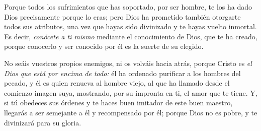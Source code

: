 \begin{body}
	Porque todos los sufrimientos que has soportado, por ser hombre, te los ha dado Dios precisamente porque lo eras; pero Dios ha prometido también otorgarte todos sus atributos, una vez que hayas sido divinizado y te hayas vuelto inmortal. Es decir, \emph{conócete a ti mismo} mediante el conocimiento de Dios, que te ha creado, porque conocerlo y ser conocido por él es la suerte de su elegido.
	
	No seáis vuestros propios enemigos, ni os volváis hacia atrás, porque Cristo es \emph{el Dios que está por encima de todo:} él ha ordenado purificar a los hombres del pecado, y él es quien renueva al hombre viejo, al que ha llamado desde el comienzo imagen suya, mostrando, por su impronta en ti, el amor que te tiene. Y, si tú obedeces sus órdenes y te haces buen imitador de este buen maestro, llegarás a ser semejante a él y recompensado por él; porque Dios no es pobre, y te divinizará para su gloria.
\end{body}